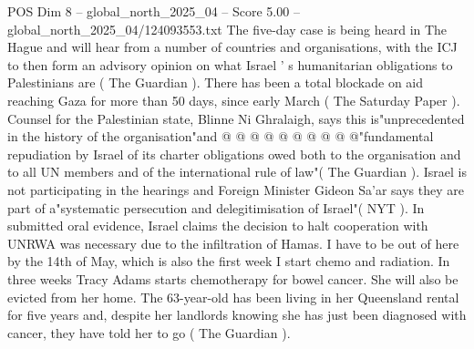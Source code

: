 \begin{textsample}{POS Dim 8 – global\_north\_2025\_04 – Score 5.00 – global\_north\_2025\_04/124093553.txt}
The five-day case is being heard in The Hague and will hear from a number of countries and organisations, with the ICJ to then form an advisory opinion on what Israel ' s humanitarian obligations to Palestinians are ( The Guardian ).
There has been a total blockade on aid reaching Gaza for more than 50 days, since early March ( The Saturday Paper ).
Counsel for the Palestinian state, Blinne Ni Ghralaigh, says this is"unprecedented in the history of the organisation"and @ @ @ @ @ @ @ @ @ @"fundamental repudiation by Israel of its charter obligations owed both to the organisation and to all UN members and of the international rule of law"( The Guardian ).
Israel is not participating in the hearings and Foreign Minister Gideon Sa'ar says they are part of a"systematic persecution and delegitimisation of Israel"( NYT ).
In submitted oral evidence, Israel claims the decision to halt cooperation with UNRWA was necessary due to the infiltration of Hamas.
I have to be out of here by the 14th of May, which is also the first week I start chemo and radiation.
In three weeks Tracy Adams starts chemotherapy for bowel cancer.
She will also be evicted from her home.
The 63-year-old has been living in her Queensland rental for five years and, despite her landlords knowing she has just been diagnosed with cancer, they have told her to go ( The Guardian ).

\end{textsample}
